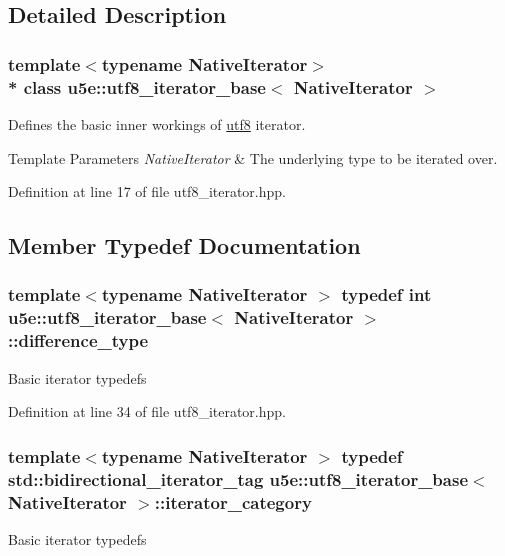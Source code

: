 \subsection{Detailed Description}
\subsubsection*{template$<$typename Native\+Iterator$>$\\*
class u5e\+::utf8\+\_\+iterator\+\_\+base$<$ Native\+Iterator $>$}

Defines the basic inner workings of \hyperlink{classu5e_1_1utf8}{utf8} iterator. 


\begin{DoxyTemplParams}{Template Parameters}
{\em Native\+Iterator} & The underlying type to be iterated over. \\
\hline
\end{DoxyTemplParams}


Definition at line 17 of file utf8\+\_\+iterator.\+hpp.



\subsection{Member Typedef Documentation}
\subsubsection[{\texorpdfstring{difference\+\_\+type}{difference_type}}]{\setlength{\rightskip}{0pt plus 5cm}template$<$typename Native\+Iterator $>$ typedef int {\bf u5e\+::utf8\+\_\+iterator\+\_\+base}$<$ Native\+Iterator $>$\+::{\bf difference\+\_\+type}}\hypertarget{classu5e_1_1utf8__iterator__base_a5b9d4769be94cd6a896ea2305927e467}{}\label{classu5e_1_1utf8__iterator__base_a5b9d4769be94cd6a896ea2305927e467}
Basic iterator typedefs 

Definition at line 34 of file utf8\+\_\+iterator.\+hpp.

\subsubsection[{\texorpdfstring{iterator\+\_\+category}{iterator_category}}]{\setlength{\rightskip}{0pt plus 5cm}template$<$typename Native\+Iterator $>$ typedef std\+::bidirectional\+\_\+iterator\+\_\+tag {\bf u5e\+::utf8\+\_\+iterator\+\_\+base}$<$ Native\+Iterator $>$\+::{\bf iterator\+\_\+category}}\hypertarget{classu5e_1_1utf8__iterator__base_a06735854415e6c5c5a7488c9fcd8a115}{}\label{classu5e_1_1utf8__iterator__base_a06735854415e6c5c5a7488c9fcd8a115}
Basic iterator typedefs 


